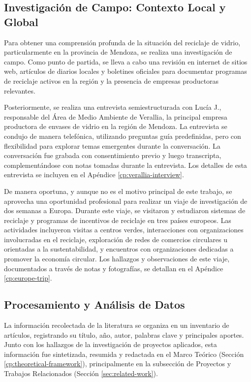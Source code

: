 \subsection{Investigación de Campo: Contexto Local y Global}

Para obtener una comprensión profunda de la situación del reciclaje de vidrio, particularmente en la provincia de Mendoza, se realiza una investigación de campo. Como punto de partida, se lleva a cabo una revisión en internet de sitios web, artículos de diarios locales y boletines oficiales para documentar programas de reciclaje activos en la región y la presencia de empresas productoras relevantes.

Posteriormente, se realiza una entrevista semiestructurada con Lucía J., responsable del Área de Medio Ambiente de Verallia, la principal empresa productora de envases de vidrio en la región de Mendoza. La entrevista se condujo de manera telefónica, utilizando preguntas guía predefinidas, pero con flexibilidad para explorar temas emergentes durante la conversación. La conversación fue grabada con consentimiento previo y luego transcripta, complementándose con notas tomadas durante la entrevista. Los detalles de esta entrevista se incluyen en el Apéndice \ref{cp:verallia-interview}.

De manera oportuna, y aunque no es el motivo principal de este trabajo, se aprovecha una oportunidad profesional para realizar un viaje de investigación de dos semanas a Europa. Durante este viaje, se visitaron y estudiaron sistemas de reciclaje y programas de incentivos de reciclaje en tres países europeos. Las actividades incluyeron visitas a centros verdes, interacciones con organizaciones involucradas en el reciclaje, exploración de redes de comercios circulares u orientadas a la sustentabilidad, y encuentros con organizaciones dedicadas a promover la economía circular. Los hallazgos y observaciones de este viaje, documentados a través de notas y fotografías, se detallan en el Apéndice \ref{cp:europe-trip}.

\subsection{Procesamiento y Análisis de Datos}
La información recolectada de la literatura se organiza en un inventario de artículos, registrando su título, año, autor, palabras clave y principales aportes. Junto con los hallazgos de la investigación de proyectos aplicados, esta información fue sintetizada, resumida y redactada en el Marco Teórico (Sección \ref{cp:theoretical-framework}), principalmente en la subsección de Proyectos y Trabajos Relacionados (Sección \ref{sec:related-work}).

